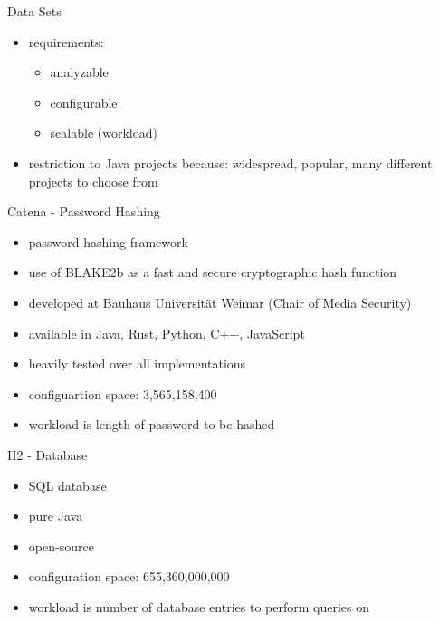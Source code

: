 \documentclass[11pt,aspectratio=169]{beamer}
\begin{document}

\begin{frame}{Data Sets}
  \begin{itemize}
    \item requirements:
    \begin{itemize}
      \item analyzable
      \item configurable
      \item scalable (workload)
    \end{itemize}
    \item restriction to Java projects because: widespread, popular, many different projects to choose from
  \end{itemize}
\end{frame}

\begin{frame}{Catena - Password Hashing}
  \begin{itemize}
    \item password hashing framework
    \item use of BLAKE2b as a fast and secure cryptographic hash function
    \item developed at Bauhaus Universität Weimar (Chair of Media Security)
    \pause
    \item available in Java, Rust, Python, C++, JavaScript
    \item heavily tested over all implementations
    \item configuartion space: 3,565,158,400
    \item workload is length of password to be hashed
  \end{itemize}
\end{frame}

\begin{frame}{H2 - Database}
  \begin{itemize}
    \item SQL database
    \item pure Java
    \item open-source
    \item configuration space: 655,360,000,000
    \item workload is number of database entries to perform queries on
  \end{itemize}
\end{frame}
\end{document}

